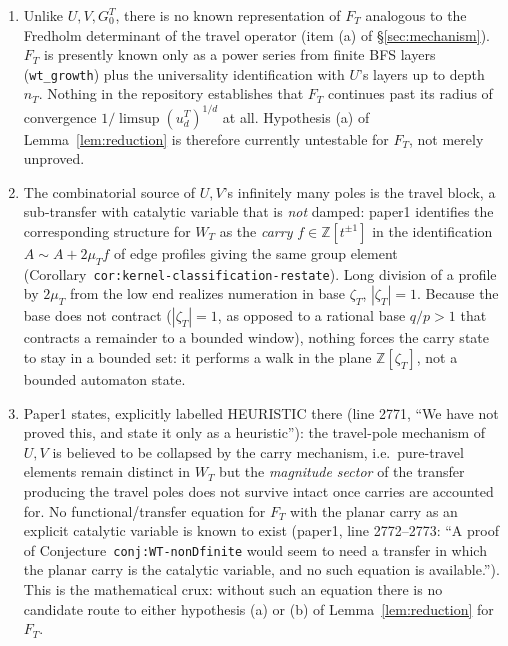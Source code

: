 \documentclass[11pt]{article}
\theoremstyle{remark}
\newcommand{\Z}{\mathbb Z}
\begin{document}
\begin{enumerate}
\item[\textbf{Gap 1 (no known continuation).}] Unlike $U,V,G^T_0$, there is no known representation of
$F_T$ analogous to the Fredholm determinant of the travel operator (item (a) of \S\ref{sec:mechanism}).
$F_T$ is presently known only as a power series from finite BFS layers (\texttt{wt\_growth}) plus the
universality identification with $U$'s layers up to depth $n_T$. Nothing in the repository establishes
that $F_T$ continues past its radius of convergence $1/\limsup(u_d^T)^{1/d}$ at all. Hypothesis (a) of
Lemma~\ref{lem:reduction} is therefore currently untestable for $F_T$, not merely unproved.
\item[\textbf{Gap 2 (the natural transfer variable is different, and its dynamics look wrong).}] The
combinatorial source of $U,V$'s infinitely many poles is the travel block, a sub-transfer with
catalytic variable that is \emph{not} damped: paper1 identifies the corresponding structure for $W_T$ as
the \emph{carry} $f\in\Z[t^{\pm1}]$ in the identification $A\sim A+2\mu_Tf$ of edge profiles giving the
same group element (Corollary~\texttt{cor:kernel-classification-restate}). Long division of a profile
by $2\mu_T$ from the low end realizes numeration in base $\zeta_T$, $|\zeta_T|=1$. Because the base does
not contract ($|\zeta_T|=1$, as opposed to a rational base $q/p>1$ that contracts a remainder to a
bounded window), nothing forces the carry state to stay in a bounded set: it performs a walk in the
plane $\Z[\zeta_T]$, not a bounded automaton state.
\item[\textbf{Gap 3 (a proof would need a carry-catalytic transfer equation, and none exists).}]
Paper1 states, explicitly labelled HEURISTIC there (line 2771, ``We have not proved this, and state it
only as a heuristic''): the travel-pole mechanism of $U,V$ is believed to be collapsed by the carry
mechanism, i.e.\ pure-travel elements remain distinct in $W_T$ but the \emph{magnitude sector} of the
transfer producing the travel poles does not survive intact once carries are accounted for. No
functional/transfer equation for $F_T$ with the planar carry as an explicit catalytic variable is
known to exist (paper1, line 2772--2773: ``A proof of Conjecture~\texttt{conj:WT-nonDfinite} would seem
to need a transfer in which the planar carry is the catalytic variable, and no such equation is
available.''). This is the mathematical crux: without such an equation there is no candidate route to
either hypothesis (a) or (b) of Lemma~\ref{lem:reduction} for $F_T$.
\end{enumerate}
\end{document}
